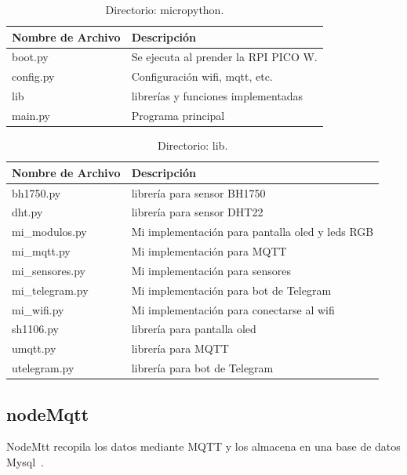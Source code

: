 \begin{table}[htbp]
\begin{center}
\caption{Directorio: micropython.}
\begin{tabular}{|l|l|} %
\hline
\rowcolor[HTML]{C0C0C0} 
\textbf{Nombre de Archivo} & \textbf{Descripción}\\ \hline
boot.py & Se ejecuta al prender la RPI PICO W.\\ \hline
config.py & Configuración wifi, mqtt, etc.\\ \hline
lib & librerías y funciones implementadas\\ \hline
main.py & Programa principal\\ \hline
\end{tabular}
\label{tabla:micropython}
\end{center}
\end{table}

\begin{table}[htbp]
\begin{center}
\caption{Directorio: lib.}
\begin{tabular}{|l|l|} %
\hline
\rowcolor[HTML]{C0C0C0} 
\textbf{Nombre de Archivo} & \textbf{Descripción}\\ \hline
bh1750.py & librería para sensor BH1750~\cite{manual:BH1750}\\ \hline
dht.py & librería para sensor DHT22~\cite{manual:DHT22} \\ \hline
mi\_modulos.py & Mi implementación para pantalla oled y leds RGB\\ \hline
mi\_mqtt.py & Mi implementación para MQTT \\ \hline
mi\_sensores.py & Mi implementación para sensores\\ \hline
mi\_telegram.py & Mi implementación para bot de Telegram\\ \hline
mi\_wifi.py & Mi implementación para conectarse al wifi\\ \hline
sh1106.py & librería para pantalla oled~\cite{manual:Oled}\\ \hline
umqtt.py & librería para MQTT~\cite{misc:umqtt}\\ \hline
utelegram.py & librería para bot de Telegram~\cite{misc:Telegram_bots}\\ \hline
\end{tabular}
\label{tabla:lib}
\end{center}
\end{table}

\subsection{nodeMqtt}
NodeMtt recopila los datos mediante MQTT y los almacena en una base de datos Mysql~\cite{misc:Mysql}.

